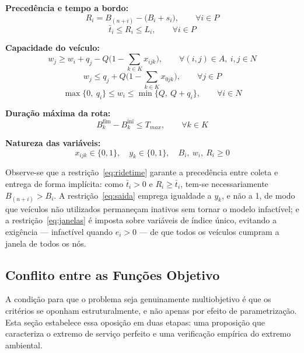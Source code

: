 \documentclass[12pt,a4paper]{article}
\theoremstyle{plain}
\begin{document}
\textbf{Precedência e tempo a bordo:}
\begin{equation}
R_i = B_{(n+i)} - \big(B_i + s_i\big), \qquad \forall i \in P
\end{equation}
\begin{equation}
\bar{t}_i \leq R_i \leq L_i, \qquad \forall i \in P
\label{eq:ridetime}
\end{equation}

\textbf{Capacidade do veículo:}
\begin{equation}
w_j \geq w_i + q_j - Q\Big(1 - \sum_{k \in K} x_{ijk}\Big), \qquad \forall (i,j) \in A,\ i,j \in N
\end{equation}
\begin{equation}
w_j \leq q_j + Q\Big(1 - \sum_{k \in K} x_{0jk}\Big), \qquad \forall j \in P
\end{equation}
\begin{equation}
\max\{0,\ q_i\} \leq w_i \leq \min\{Q,\ Q + q_i\}, \qquad \forall i \in N
\end{equation}

\textbf{Duração máxima da rota:}
\begin{equation}
B^{\text{fim}}_k - B^{\text{ini}}_k \leq T_{max}, \qquad \forall k \in K
\end{equation}

\textbf{Natureza das variáveis:}
\begin{equation}
x_{ijk} \in \{0,1\}, \quad y_k \in \{0,1\}, \quad B_i,\ w_i,\ R_i \geq 0
\end{equation}

Observe-se que a restrição~\eqref{eq:ridetime} garante a precedência entre coleta e entrega de forma implícita: como $\bar{t}_i > 0$ e $R_i \geq \bar{t}_i$, tem-se necessariamente $B_{(n+i)} > B_i$. A restrição~\eqref{eq:saida} emprega igualdade a $y_k$, e não a 1, de modo que veículos não utilizados permaneçam inativos sem tornar o modelo infactível; e a restrição~\eqref{eq:janelas} é imposta sobre variáveis de índice único, evitando a exigência --- infactível quando $e_i > 0$ --- de que todos os veículos cumpram a janela de todos os nós.

\subsection{Conflito entre as Funções Objetivo}
\label{sec:conflito}

A condição para que o problema seja genuinamente multiobjetivo é que os critérios se oponham estruturalmente, e não apenas por efeito de parametrização. Esta seção estabelece essa oposição em duas etapas: uma proposição que caracteriza o extremo de serviço perfeito e uma verificação empírica do extremo ambiental.
\end{document}
